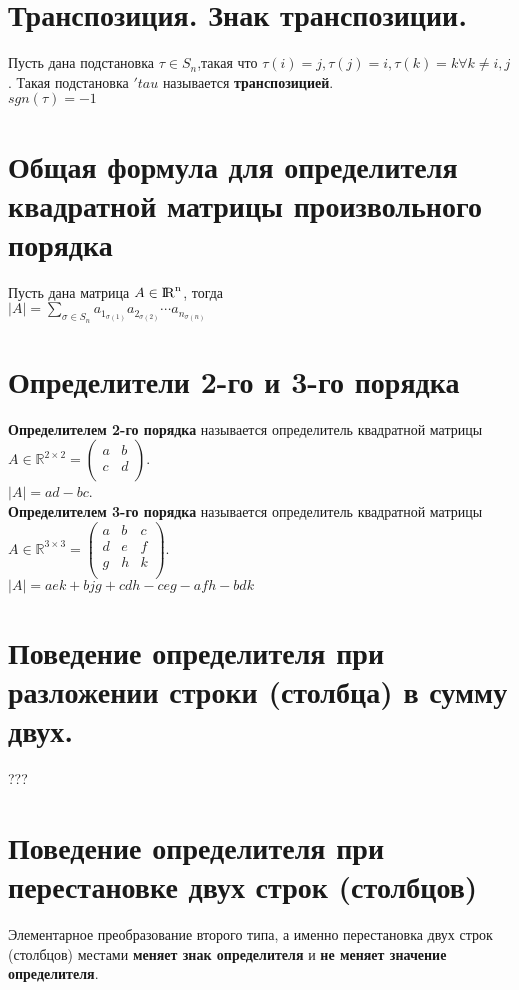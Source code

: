 \documentclass[a4paper,11pt]{report}
\DeclareMathOperator{\Mn}{{\rm I\!R}^{n}}
\begin{document}
\section{Транспозиция. Знак транспозиции.}
Пусть дана подстановка $\tau \in S_n$,такая что $\tau(i) = j, \tau(j) = i, \tau(k) = k \forall k \neq i, j$. 
Такая подстановка $'tau$ называется \textbf{транспозицией}.\\
$sgn(\tau) = -1$\\
\section{Общая формула для определителя квадратной матрицы произвольного порядка}
Пусть дана матрица $A \in \Mn$, тогда\\
$|A| = \sum\limits_{\sigma \in S_n}a_1_{\sigma(1)}a_2_{\sigma(2)}\cdots{a_n_{\sigma(n)}}$
\section{Определители 2-го и 3-го порядка}
\textbf{Определителем 2-го порядка} называется определитель квадратной матрицы $A \in \mathbb{R}^{2\times{2}} = 
\begin{pmatrix}
a & b\\
c & d\\
\end{pmatrix}
$.\\
$|A| = ad - bc$.\\
\textbf{Определителем 3-го порядка} называется определитель квадратной матрицы $A \in \mathbb{R}^{3\times{3}} =
\begin{pmatrix}
 a & b & c\\
 d & e & f\\
 g & h & k\\
\end{pmatrix}
$.\\
$|A| = aek + bjg + cdh - ceg - afh - bdk$\\
\section{Поведение определителя при разложении строки (столбца) в сумму двух.}
???
\section{Поведение определителя при перестановке двух строк (столбцов)} 
Элементарное преобразование второго типа, а именно перестановка двух строк (столбцов) местами
\textbf{меняет знак определителя} и \textbf{не меняет значение определителя}.
\end{document}
